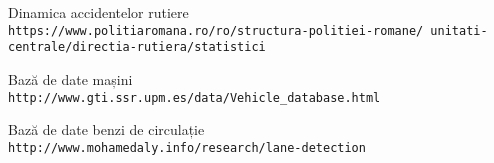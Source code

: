 \begin{thebibliography}{9}
	Dinamica accidentelor rutiere
	\\\texttt{https://www.politiaromana.ro/ro/structura-politiei-romane/
		unitati-centrale/directia-rutiera/statistici}
	
	Bază de date mașini
	\\\texttt{http://www.gti.ssr.upm.es/data/Vehicle\_database.html}
	
	Bază de date benzi de circulație
	\\\texttt{http://www.mohamedaly.info/research/lane-detection}
	
	
\end{thebibliography}